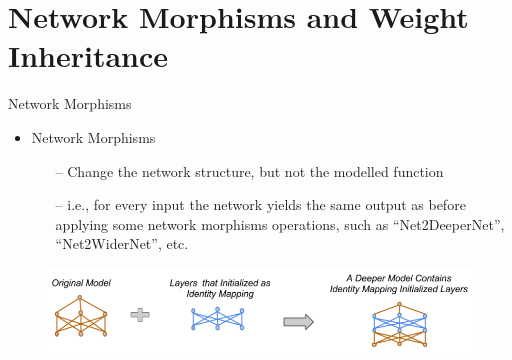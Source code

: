 \section{Network Morphisms and Weight Inheritance}


\begin{frame}{Network Morphisms}
    \begin{itemize}
    	\item \alert{Network Morphisms} 
	\begin{itemize}
		\item[--] \alert{Change the network structure, but not the modelled function}
		\item[--] i.e., for every input the network yields the same output as before applying
		some network morphisms operations, such as ``Net2DeeperNet'', ``Net2WiderNet'', etc.
	\end{itemize}
    \end{itemize}

    \begin{figure}[t]
        \begin{centering}
            \includegraphics[scale=0.3]{images_lec7/net2deepernet.png}
        \end{centering}
    \end{figure}

\end{frame}

